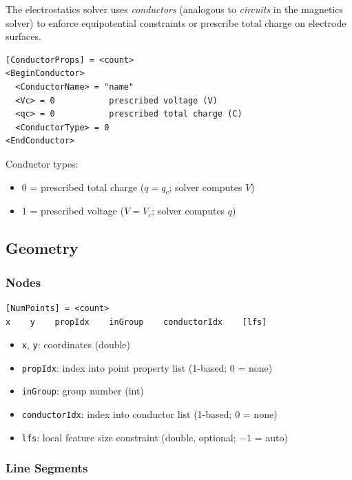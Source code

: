 \documentclass[11pt]{article}
\begin{document}
The electrostatics solver uses \emph{conductors} (analogous to
\emph{circuits} in the magnetics solver) to enforce equipotential
constraints or prescribe total charge on electrode surfaces.

\begin{lstlisting}
[ConductorProps] = <count>
<BeginConductor>
  <ConductorName> = "name"
  <Vc> = 0           prescribed voltage (V)
  <qc> = 0           prescribed total charge (C)
  <ConductorType> = 0
<EndConductor>
\end{lstlisting}

Conductor types:
\begin{itemize}[nosep]
  \item 0 = prescribed total charge ($q = q_c$; solver computes $V$)
  \item 1 = prescribed voltage ($V = V_c$; solver computes $q$)
\end{itemize}

\subsection{Geometry}

\subsubsection{Nodes}

\begin{lstlisting}
[NumPoints] = <count>
x    y    propIdx    inGroup    conductorIdx    [lfs]
\end{lstlisting}

\begin{itemize}[nosep]
  \item \texttt{x}, \texttt{y}: coordinates (double)
  \item \texttt{propIdx}: index into point property list (1-based; 0 = none)
  \item \texttt{inGroup}: group number (int)
  \item \texttt{conductorIdx}: index into conductor list (1-based; 0 = none)
  \item \texttt{lfs}: local feature size constraint (double, optional; $-1$ = auto)
\end{itemize}

\subsubsection{Line Segments}
\end{document}
